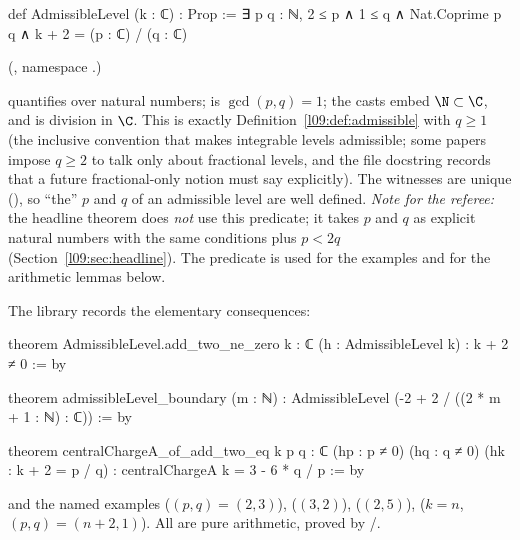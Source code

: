 \begin{leancode}
def AdmissibleLevel (k : ℂ) : Prop :=
  ∃ p q : ℕ, 2 ≤ p ∧ 1 ≤ q ∧ Nat.Coprime p q ∧ k + 2 = (p : ℂ) / (q : ℂ)
\end{leancode}
(, namespace .)

\begin{dictionary}
 quantifies over natural numbers;  is $\gcd(p,q)=1$; the casts
 embed $\N\subset\C$, and \lean{/} is division in $\C$. This is exactly
Definition~\ref{l09:def:admissible} with $q\ge1$ (the inclusive convention that makes integrable
levels admissible; some papers impose $q\ge2$ to talk only about fractional levels, and the file
docstring records that a future fractional-only notion must say  explicitly). The
witnesses are unique (), so ``the'' $p$ and $q$ of an
admissible level are well defined. \emph{Note for the referee:} the headline theorem does
\emph{not} use this predicate; it takes $p$ and $q$ as explicit natural numbers with the same
conditions plus $p<2q$ (Section~\ref{l09:sec:headline}). The predicate is used for the examples
and for the arithmetic lemmas below.
\end{dictionary}

The library records the elementary consequences:

\begin{leancode}
theorem AdmissibleLevel.add_two_ne_zero {k : ℂ} (h : AdmissibleLevel k) : k + 2 ≠ 0 := by
\end{leancode}
\begin{leancode}
theorem admissibleLevel_boundary (m : ℕ) :
    AdmissibleLevel (-2 + 2 / ((2 * m + 1 : ℕ) : ℂ)) := by
\end{leancode}
\begin{leancode}
theorem centralChargeA_of_add_two_eq {k p q : ℂ} (hp : p ≠ 0) (hq : q ≠ 0)
    (hk : k + 2 = p / q) : centralChargeA k = 3 - 6 * q / p := by
\end{leancode}
and the named examples  ($(p,q) = (2,3)$),
 ($(3,2)$),  ($(2,5)$),
 ($k = n$, $(p,q) = (n+2,1)$). All are pure arithmetic, proved by
/.

